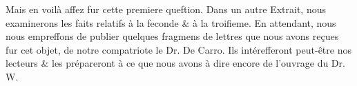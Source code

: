 Mais en voilà affez fur cette premiere queftion. Dans un autre Extrait, nous examinerons les faits relatifs à la feconde & à la troifieme. En attendant, nous nous empreffons de publier quelques fragmens de lettres que nous avons reçues fur cet objet, de notre compatriote le Dr. De Carro. Ils intérefferont peut-être nos lecteurs & les prépareront à ce que nous avons à dire encore de l'ouvrage du Dr. W.
